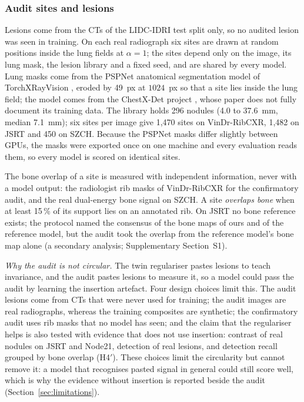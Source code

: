 \subsubsection{Audit sites and lesions}
\label{sec:m-audit}
Lesions come from the CTs of the LIDC-IDRI test split only, so no audited lesion was seen in training. On each real radiograph six sites are
drawn at random positions inside the lung fields at $\alpha=1$; the sites depend only on the image, its lung mask, the lesion library and a
fixed seed, and are shared by every model. Lung masks come from the PSPNet anatomical segmentation model of TorchXRayVision
\cite{cohen2022torchxrayvision}, eroded by 49~px at $1024$~px so that a site lies inside the lung field; the model comes from the ChestX-Det
project \cite{lian2021chestxdet}, whose paper does not fully document its training data. The library holds 296 nodules (4.0 to 37.6~mm,
median 7.1~mm); six sites per image give 1,470 sites on VinDr-RibCXR, 1,482 on JSRT and 450 on SZCH. Because the PSPNet masks differ
slightly between GPUs, the masks were exported once on one machine and every evaluation reads them, so every model is scored on identical
sites.

The bone overlap of a site is measured with independent information, never with a model output: the radiologist rib masks of VinDr-RibCXR
\cite{nguyen2021ribcxr} for the confirmatory audit, and the real dual-energy bone signal on SZCH. A site \emph{overlaps bone} when at least
15\,\% of its support lies on an annotated rib. On JSRT no bone reference exists; the protocol named the consensus of the bone maps of ours
and of the reference model, but the audit took the overlap from the reference model's bone map alone (a secondary analysis;
Supplementary Section~S1).

\emph{Why the audit is not circular.} The twin regulariser pastes lesions to teach invariance, and the audit pastes lesions to measure it,
so a model could pass the audit by learning the insertion artefact. Four design choices limit this. The audit lesions come from CTs that
were never used for training; the audit images are real radiographs, whereas the training composites are synthetic; the confirmatory audit
uses rib masks that no model has seen; and the claim that the regulariser helps is also tested with evidence that does not use insertion:
contrast of real nodules on JSRT and Node21, detection of real lesions, and detection recall grouped by bone overlap (H4$'$). These choices
limit the circularity but cannot remove it: a model that recognises pasted signal in general could still score well, which is why the
evidence without insertion is reported beside the audit (Section~\ref{sec:limitations}).

